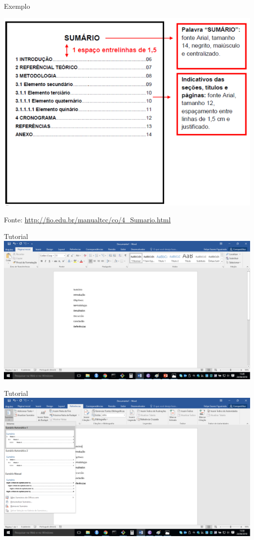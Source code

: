 \documentclass{beamer}
\begin{document}
\begin{frame}{Exemplo}
  \begin{center}
    \includegraphics[height=0.8\textheight]{ProjetoII/sumario}
  \end{center}

  Fonte: \url{http://fio.edu.br/manualtcc/co/4_Sumario.html}
\end{frame}

\begin{frame}{Tutorial}
  \includegraphics[height=0.9\textheight]{ProjetoII/sumario1}
\end{frame}

\begin{frame}{Tutorial}
  \includegraphics[height=0.9\textheight]{ProjetoII/sumario2}
\end{frame}
\end{document}
